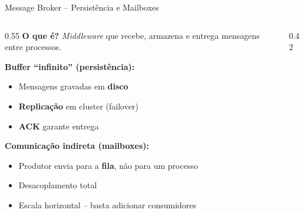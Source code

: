 \documentclass[10pt,aspectratio=169]{beamer}
\begin{document}
\begin{frame}{Message Broker -- Persistência e Mailboxes}
    \begin{columns}[T]
        \begin{column}{0.55\textwidth}
            \textbf{O que é?} \emph{Middleware} que recebe, armazena e entrega mensagens entre processos.

            \vspace{0.25cm}
            \textbf{Buffer ``infinito'' (persistência):}
            \begin{itemize}
                \item Mensagens gravadas em \textbf{disco}
                \item \textbf{Replicação} em cluster (failover)
                \item \textbf{ACK} garante entrega
            \end{itemize}

            \vspace{0.2cm}
            \textbf{Comunicação indireta (mailboxes):}
            \begin{itemize}
                \item Produtor envia para a \textbf{fila}, não para um processo
                \item Desacoplamento total
                \item Escala horizontal -- basta adicionar consumidores
            \end{itemize}
        \end{column}
        \begin{column}{0.42\textwidth}
            \begin{center}
            \end{center}
        \end{column}
    \end{columns}
\end{frame}
\end{document}
